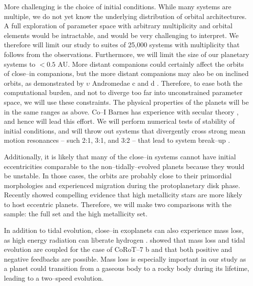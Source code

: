 More challenging is the choice of initial conditions.  While many
\kepler systems are multiple, we do not yet know the underlying
distribution of orbital architectures.  A full exploration of
parameter space with arbitrary multiplicity and orbital elements would
be intractable, and would be very challenging to interpret.  We
therefore will limit our study to suites of 25,000 systems with
multiplicity that follows from the observations.  Furthermore, we will
limit the size of our planetary systems to $<0.5$ AU.  More distant
companions could certainly affect the orbits of close--in companions,
but the more distant companions may also be on inclined orbits, as
demonstrated by $\upsilon$ Andromedae c and d
\citep{McArthur10,ReffertQuirrenbach11}.  Therefore, to ease both the
computational burden, and not to diverge too far into unconstrained
parameter space, we will use these constraints.  The physical
properties of the planets will be in the same ranges as above.  Co--I
Barnes has experience with secular theory
\citep{BarnesGreenberg06a,BarnesGreenberg06b}, and hence will lead
this effort.  We will perform numerical tests of stability of initial
conditions, and will throw out systems that divergently cross strong
mean motion resonances -- such 2:1, 3:1, and 3:2 -- that lead to
system break--up \citep[e.g.][]{Gomes05}.

Additionally, it is likely that many of the close--in systems cannot
have initial eccentricities comparable to the non--tidally--evolved
planets because they would be unstable.  In those cases, the orbits
are probably close to their primordial morphologies and experienced
migration during the protoplanetary disk phase.  Recently
\cite{DawsonMurrayClay13} showed compelling evidence that high
metallicity stars are more likely to host eccentric planets.
Therefore, we will make two comparisons with the \kepler sample: the
full set and the high metallicity set.

\medskip
{\centerline{}}
\smallskip

In addition to tidal evolution, close--in exoplanets can also
experience mass loss, as high energy radiation can liberate hydrogen
\citep{Watson81,VidalMadjar03}.  \cite{Jackson10} showed that mass
loss and tidal evolution are coupled for the case of CoRoT--7 b and
that both positive and negative feedbacks are possible.  Mass loss is
especially important in our study as a planet could transition from a
gaseous body to a rocky body during its lifetime, leading to a
two--speed evolution.

